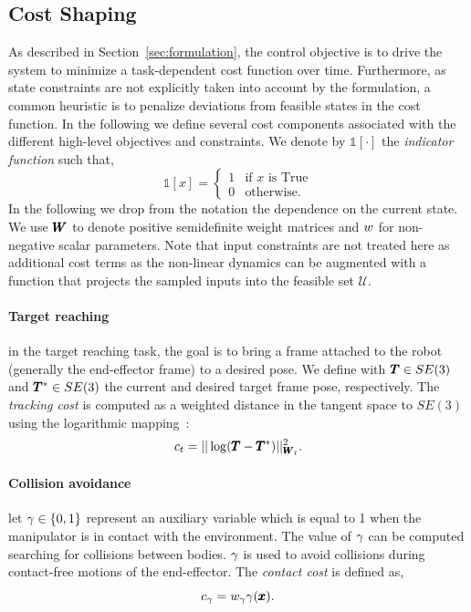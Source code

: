 \subsection{Cost Shaping}
As described in Section~\ref{sec:formulation}, the control objective is to drive the system to minimize a task-dependent cost function over time. Furthermore, as state constraints are not explicitly taken into account by the formulation, a common heuristic is to penalize deviations from feasible states in the cost function. In the following we define several cost components associated with the different high-level objectives and constraints.
We denote by $\mathds{1}[\cdot]$ the \textit{indicator function} such that,
\begin{equation}
    \mathds{1}[x] = 
    \begin{cases}
    1 & \text{if } x \text{ is True} \\
    0 & \text{otherwise}.
    \end{cases}
\end{equation}
In the following we drop from the notation the dependence on the current state. We use $\pmb{W}_{}$ to denote positive semidefinite weight matrices and $w_{}$ for non-negative scalar parameters. Note that input constraints are not treated here as additional cost terms as the non-linear dynamics can be augmented with a function that projects the sampled inputs into the feasible set $\mathcal{U}$.

\paragraph{Target reaching} in the target reaching task, the goal is to bring a frame attached to the robot (generally the end-effector frame) to a desired pose. We define with $\pmb{T} \in SE(3)$ and $\pmb{T}^* \in SE(3)$ the current and desired target frame pose, respectively. The \textit{tracking cost} is computed as a weighted distance in the tangent space to $SE(3)$ using the logarithmic mapping~\cite{blanco2010tutorial}:
\begin{equation} \label{eq:tracking_cost}
     c_{t} = || \log(\pmb{T} - \pmb{T}^{*}) ||^2_{\pmb{W}_{t}}.
 \end{equation}
 
 \paragraph{Collision avoidance} let $\gamma \in \{0, 1\}$ represent an auxiliary variable which is equal to 1 when the manipulator is in contact with the environment. The value of $\gamma$ can be computed searching for collisions between bodies. 
 $\gamma$ is used to avoid collisions during contact-free motions of the end-effector. 
 The \textit{contact cost} is defined as,
 \begin{equation}
     c_{\gamma}= w_{\gamma} \gamma(\pmb{x}).
 \end{equation}

